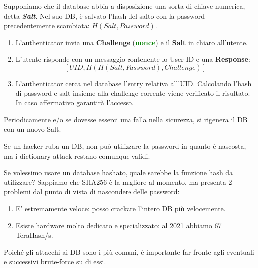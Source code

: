 \begin{proposition}
Supponiamo che il database abbia a disposizione una sorta di chiave numerica, detta \textit{\textbf{Salt}}. Nel suo DB, è salvato l'hash del salto con la password precedentemente scambiata: $H(Salt, Password)$.
\begin{enumerate}
    \item L'authenticator invia una \textbf{Challenge} (\textbf{\textcolor{green}{nonce}}) e il \textbf{Salt} in chiaro all'utente. 
    \item L'utente risponde con un messaggio contenente lo User ID e una \textbf{Response}:
    \[[UID,H(H(Salt, Password),Challenge)]\]
    \item L'authenticator cerca nel database l'entry relativa all'UID. Calcolando l'hash di password e salt insieme alla challenge corrente viene verificato il risultato. In caso affermativo garantirà l’accesso.
\end{enumerate}
Periodicamente e/o se dovesse esserci una falla nella sicurezza, si rigenera il DB con un nuovo Salt. 
\end{proposition}
\begin{remark}
Se un hacker ruba un DB, non può utilizzare la password in quanto è nascosta, ma i dictionary-attack restano comunque validi. 
\end{remark}
\begin{remark}Se volessimo usare un database hashato, quale sarebbe la funzione hash da utilizzare? Sappiamo che SHA256 è la migliore al momento, ma presenta 2 problemi dal punto di vista di nascondere delle password:
\begin{enumerate}
    \item E' estremamente veloce: posso crackare l'intero DB più velocemente.
    \item Esiste hardware molto dedicato e specializzato: al 2021 abbiamo 67 TeraHash/s.
\end{enumerate}
Poiché gli attacchi ai DB sono i più comuni, è importante far fronte agli eventuali e successivi brute-force su di essi.
\end{remark}
